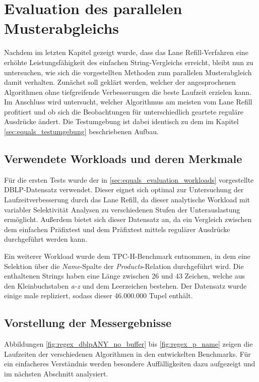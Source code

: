 \chapter{Evaluation des parallelen Musterabgleichs}

Nachdem im letzten Kapitel gezeigt wurde, dass das Lane Refill-Verfahren eine erhöhte Leistungsfähigkeit des einfachen String-Vergleichs erreicht, bleibt nun zu untersuchen, wie sich die vorgestellten Methoden zum parallelen Musterabgleich damit verhalten.
Zunächst soll geklärt werden, welcher der angesprochenen Algorithmen ohne tiefgreifende Verbesserungen die beste Laufzeit erzielen kann.
Im Anschluss wird untersucht, welcher Algorithmus am meisten vom Lane Refill profitiert und ob sich die Beobachtungen für unterschiedlich geartete reguläre Ausdrücke ändert.
Die Testumgebung ist dabei identisch zu dem im Kapitel \ref{sec:equals_testumgebung} beschriebenen Aufbau.

\section{Verwendete Workloads und deren Merkmale}

Für die ersten Tests wurde der in \ref{sec:equals_evaluation_workloads} vorgestellte DBLP-Datensatz verwendet.
Dieser eignet sich optimal zur Untersuchung der Laufzeitverbesserung durch das Lane Refill, da dieser analytische Workload mit variabler Selektivität Analysen zu verschiedenen Stufen der Unterauslastung ermöglicht.
Außerdem bietet sich dieser Datensatz an, da ein Vergleich zwischen dem einfachen Präfixtest und dem Präfixtest mittels regulärer Ausdrücke durchgeführt werden kann.

Ein weiterer Workload wurde dem TPC-H-Benchmark entnommen, in dem eine Selektion über die \emph{Name}-Spalte der \emph{Products}-Relation durchgeführt wird.
Die enthaltenen Strings haben eine Länge zwischen 26 und 43 Zeichen, welche aus den Kleinbuchstaben \emph{a-z} und dem Leerzeichen bestehen.
Der Datensatz wurde einige male repliziert, sodass dieser 46.000.000 Tupel enthält.

\section{Vorstellung der Messergebnisse}

Abbildungen \ref{fig:regex_dblpANY_no_buffer} bis \ref{fig:regex_p_name} zeigen die Laufzeiten der verschiedenen Algorithmen in den entwickelten Benchmarks.
Für ein einfacheres Verständnis werden besondere Auffälligkeiten dazu aufgezeigt und im nächsten Abschnitt analysiert.

